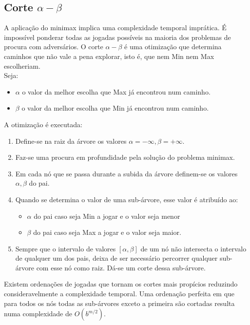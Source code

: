 \documentclass[]{report}
\begin{document}
\subsection{Corte $\alpha-\beta$}
A aplicação do minimax implica uma complexidade temporal imprática. É impossível ponderar todas as jogadas possíveis na maioria dos problemas de procura com adversários. O corte $\alpha-\beta$ é uma otimização que determina caminhos que não vale a pena explorar, isto é, que nem Min nem Max escolheriam.\\
Seja:
\begin{itemize}
	\item $\alpha$ o valor da melhor escolha que Max já encontrou num caminho.
	\item $\beta$ o valor da melhor escolha que Min já encontrou num caminho.
\end{itemize}
A otimização é executada:
\begin{enumerate}
	\item Define-se na raiz da árvore os valores $\alpha = -\infty, \beta = +\infty$.
	\item Faz-se uma procura em profundidade pela solução do problema minimax.
	\item Em cada nó que se passa durante a subida da árvore definem-se os valores $\alpha, \beta$ do pai.
	\item Quando se determina o valor de uma sub-árvore, esse valor é atribuído ao:
	\begin{itemize}
		\item $\alpha$ do pai caso seja Min a jogar e o valor seja menor
		\item $\beta$ do pai caso seja Max a jogar e o valor seja maior.
	\end{itemize}
	\item Sempre que o intervalo de valores $[\alpha, \beta]$ de um nó não intersecta o intervalo de qualquer um dos pais, deixa de ser necessário percorrer qualquer sub-árvore com esse nó como raiz. Dá-se um corte dessa sub-árvore.
\end{enumerate}
Existem ordenações de jogadas que tornam os cortes mais propícios reduzindo consideravelmente a complexidade temporal. Uma ordenação perfeita em que para todos os nós todas as sub-árvores exceto a primeira são cortadas resulta numa complexidade de $O(b^{m/2})$.
\end{document}
